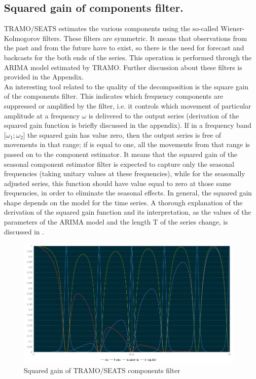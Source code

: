 \documentclass[english,blauw]{cbsdiscussionpaper}
\begin{document}
\subsection{Squared gain of components filter.}
TRAMO/SEATS estimates the various components using the so-called Wiener-Kolmogorov filters. These filters are symmetric. It means that observations from the past and from the future have to exist, so there is the need for forecast and backcasts for the both ends of the series. This operation is performed through the ARIMA model estimated by TRAMO. Further discussion about these filters is provided in the Appendix.\\ An interesting tool related to the quality of the decomposition is the square gain of the components filter. This indicates which frequency components are suppressed or amplified by the filter, i.e. it controls which movement of particular amplitude at a frequency $\omega$ is delivered to the output series (derivation of the squared gain function is briefly discussed in the appendix). If in a frequency band [$\omega_{1};\omega_{2}$] the squared gain has value zero, then the output series is free of movements in that range; if is equal to one, all the movements from that range is passed on to the component estimator. It means that the squared gain of the seasonal component estimator filter is expected to capture only the seasonal frequencies (taking unitary values at these frequencies), while for the seasonally adjusted series, this function should have value equal to zero at those same frequencies, in order to eliminate the seasonal effects. In general, the squared gain shape depends on the model for the time series. A thorough explanation of the derivation of the squared gain function and its interpretation, as the values of the parameters of the ARIMA model and the length T of the series change, is discussed in \citep{fineal2006}.
\begin{figure}[h]
\includegraphics[width=\linewidth]{../images/capitolo3/squaredgain.jpg}
\caption{Squared gain of TRAMO/SEATS components filter}
\label{fig:squaredgain}
\end{figure}
\end{document}
